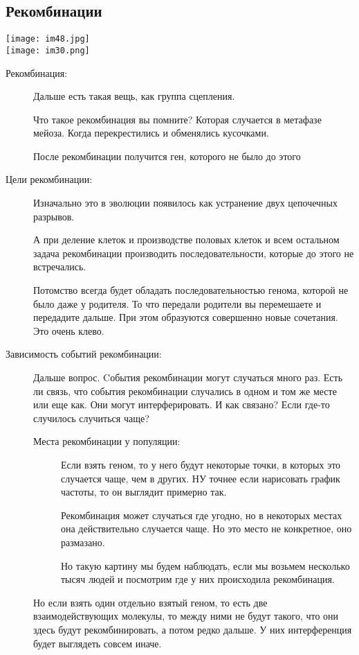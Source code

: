 \subsection{Рекомбинации}
\texttt{[image: im48.jpg]}\\
\texttt{[image: im30.png]}

\begin{description}
\item[Рекомбинация:]
Дальше есть такая вещь, как группа сцепления.

Что такое рекомбинация вы помните? Которая
случается в метафазе мейоза. Когда
перекрестились и обменялись кусочками.

После рекомбинации получится ген, 
которого не было до этого 
\item[Цели рекомбинации:]
Изначально это в эволюции появилось 
как устранение двух цепочечных разрывов. 

А при деление клеток и производстве половых клеток и всем
остальном задача рекомбинации производить 
последовательности, которые до этого не встречались. 

Потомство всегда будет обладать последовательностью 
генома, которой не было даже у
родителя. То что передали родители 
вы перемешаете и передадите дальше. При этом 
образуются совершенно новые сочетания. Это очень 
клево. 

\item[Зависимость событий рекомбинации:]
Дальше вопрос. Cобытия рекомбинации могут случаться много раз. Есть 
ли связь, что события рекомбинации случались в одном и том же месте
или еще как. Они могут интерферировать. И как связано? 
Если где-то случилось случиться чаще? 

\begin{description}
\item[Места рекомбинации у популяции:]
Если взять геном, то у него будут некоторые точки, 
в которых это случается чаще, чем в других. 
НУ точнее если нарисовать график частоты, то 
он выглядит примерно так.

Рекомбинация может случаться где угодно, но в некоторых 
местах она действительно случается чаще. Но это 
место не конкретное, оно размазано. 

Но такую картину мы будем наблюдать, если 
мы возьмем несколько тысяч людей и посмотрим где 
у них происходила рекомбинация. 
\end{description}

Но если взять один отдельно взятый геном, то есть две 
взаимодействующих молекулы, то между ними не будут такого, что 
они здесь будут рекомбинировать, 
а потом редко дальше. У них интерференция 
будет выглядеть совсем иначе. 


\end{description}
